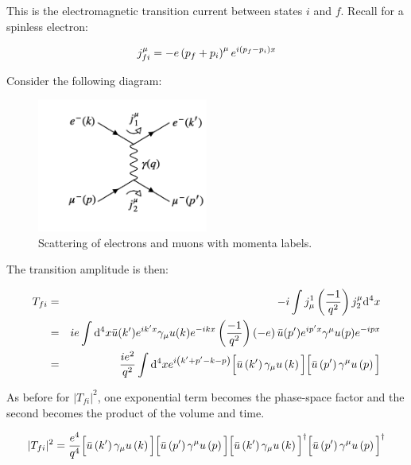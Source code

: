 This is the electromagnetic transition current between states $i$ and $f$.  Recall for a spinless electron:

\[
  j^{\mu}_{fi} = -e\left(p_f + p_i\right)^{\mu}e^{i\left(p_f - p_i\right)x}
\]

Consider the following diagram:

\begin{figure}[!htb]
  \begin{center}
    \includegraphics[width=0.5\textwidth]{images/web_feynman/image_87.png}
    \caption[Scattering of electrons and muons with momenta labels]{Scattering of electrons and muons with momenta labels.}
    \label{fig:ch8_EMuToEMuMomenta}
  \end{center}
\end{figure}

The transition amplitude is then:

\begin{eqnarray*}
  T_{fi} & = & -i\int j^{1}_{\mu}\left(\frac{-1}{q^2}\right)j^{\mu}_2 \mathrm{d}^4x \\
  & = & ie\int\mathrm{d}^4x\bar{u}(k')e^{ik'x}\gamma_{\mu}u(k)e^{-ikx}\left(\frac{-1}{q^2}\right)\left(-e\right)\bar{u}(p')e^{ip'x}\gamma^{\mu}u(p)e^{-ipx} \\
  & = & \frac{ie^2}{q^2}\int\mathrm{d}^4xe^{i\left(k'+p'-k-p\right)}
        \Big[\bar{u}\left(k'\right)\gamma_{\mu}u\left(k\right)\Big]
        \Big[\bar{u}\left(p'\right)\gamma^{\mu}u\left(p\right)\Big]
\end{eqnarray*}

As before for $|T_{fi}|^2$, one exponential term becomes the phase-space factor and the second becomes the product of the volume and time.

\[
  |T_{fi}|^2 = \frac{e^4}{q^4}
      \Big[\bar{u}\left(k'\right)\gamma_{\mu}u\left(k\right)\Big]
      \Big[\bar{u}\left(p'\right)\gamma^{\mu}u\left(p\right)\Big]
      \Big[\bar{u}\left(k'\right)\gamma_{\mu}u\left(k\right)\Big]^{\dagger}
      \Big[\bar{u}\left(p'\right)\gamma^{\mu}u\left(p\right)\Big]^{\dagger}
\]

